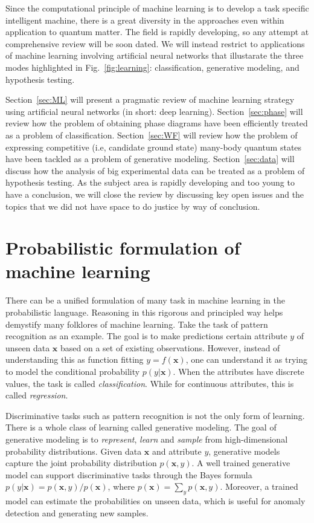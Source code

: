 \documentclass[aps,prb,floatfix,amsmath,amssymb,amsfonts,10pt,floatfix,longbibliography]{revtex4-1}
\begin{document}
Since the computational principle of machine learning is to develop a task specific intelligent machine, there is a great diversity in the approaches even within application to quantum matter.
The field is rapidly developing, so any attempt at comprehensive review will be soon dated. We will instead restrict to applications of machine learning involving artificial neural networks that illustarate the three modes highlighted in Fig.~\ref{fig:learning}: classification, generative modeling, and hypothesis testing.

Section~\ref{sec:ML} will present a pragmatic review of machine learning strategy using artificial neural networks (in short: deep learning).
Section~\ref{sec:phase} will review how the problem of obtaining phase diagrams have been efficiently treated as a problem of classification. Section~\ref{sec:WF} will review how the problem of expressing competitive (i.e, candidate ground state) many-body quantum states have been tackled as a problem of generative modeling. Section~\ref{sec:data} will discuss how the analysis of big experimental data can be treated as a problem of hypothesis testing. As the subject area is rapidly developing and too young to have a conclusion, we will close the review by discussing key open issues and the topics that we did not have space to do justice by way of conclusion. 


\section{Probabilistic formulation of machine learning}

There can be a unified formulation of many task in machine learning in the probabilistic language. Reasoning in this rigorous and principled way helps demystify many folklores of machine learning. 
Take the task of pattern recognition as an example. The goal is to make predictions certain attribute  $y$ of unseen data $\boldsymbol{x}$ based on a set of existing observations. However, instead of understanding this as function fitting $y=f(\boldsymbol{x})$, one can understand it as trying to model the conditional probability $p(y|\boldsymbol{x})$. When the attributes have discrete values, the task is called \emph{classification}. While for continuous attributes, this is called \emph{regression}. 

Discriminative tasks such as pattern recognition is not the only form of learning. There is a whole class of learning called generative modeling. The goal of generative modeling is to \emph{represent}, \emph{learn} and \emph{sample} from high-dimensional probability distributions. Given data $\boldsymbol{x}$ and attribute $y$, generative models capture the joint probability distribution $p(\boldsymbol{x}, y)$. A well trained generative model can support discriminative tasks through the Bayes formula $p(y|\boldsymbol{x}) =p(\boldsymbol{x}, y)/p(\boldsymbol{x})$, where $p(\boldsymbol{x}) = \sum_{y} p(\boldsymbol{x}, y)$. Moreover, a trained model can estimate the probabilities on unseen data, which is useful for anomaly detection and generating new samples. 
\end{document}

